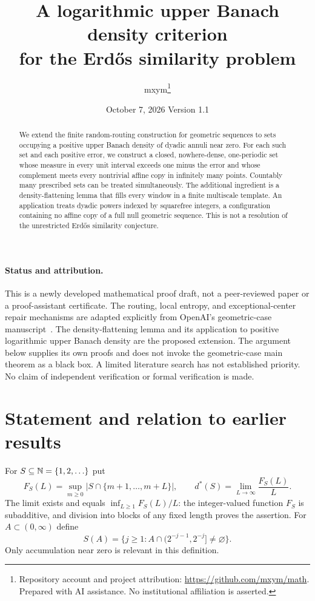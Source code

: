\documentclass[11pt]{article}
\title{A logarithmic upper Banach density criterion\\for the Erd\H{o}s similarity problem}
\author{mxym\thanks{Repository account and project attribution: \url{https://github.com/mxym/math}. Prepared with AI assistance. No institutional affiliation is asserted.}}
\date{October 7, 2026 \quad Version 1.1}
\theoremstyle{remark}\newtheorem{remark}[theorem]{Remark}
\begin{document}
\maketitle
\begin{abstract}
We extend the finite random-routing construction for geometric sequences to sets occupying a positive upper Banach density of dyadic annuli near zero. For each such set and each positive error, we construct a closed, nowhere-dense, one-periodic set whose measure in every unit interval exceeds one minus the error and whose complement meets every nontrivial affine copy in infinitely many points. Countably many prescribed sets can be treated simultaneously. The additional ingredient is a density-flattening lemma that fills every window in a finite multiscale template. An application treats dyadic powers indexed by squarefree integers, a configuration containing no affine copy of a full null geometric sequence. This is not a resolution of the unrestricted Erd\H{o}s similarity conjecture.
\end{abstract}
\paragraph{Status and attribution.}
This is a newly developed mathematical proof draft, not a peer-reviewed paper or a proof-assistant certificate. The routing, local entropy, and exceptional-center repair mechanisms are adapted explicitly from OpenAI's geometric-case manuscript~\cite{OpenAI084}. The density-flattening lemma and its application to positive logarithmic upper Banach density are the proposed extension. The argument below supplies its own proofs and does not invoke the geometric-case main theorem as a black box. A limited literature search has not established priority. No claim of independent verification or formal verification is made.

\section{Statement and relation to earlier results}
For $S\subseteq\mathbb N=\{1,2,\ldots\}$ put
\[
 F_S(L)=\sup_{m\ge0}|S\cap\{m+1,\ldots,m+L\}|,
 \qquad d^*(S)=\lim_{L\to\infty}\frac{F_S(L)}L.
\]
The limit exists and equals $\inf_{L\ge1}F_S(L)/L$: the integer-valued function $F_S$ is subadditive, and division into blocks of any fixed length proves the assertion. For $A\subset(0,\infty)$ define
\[
 S(A)=\{j\ge1:A\cap(2^{-j-1},2^{-j}]\ne\varnothing\}.
\]
Only accumulation near zero is relevant in this definition.
\end{document}

